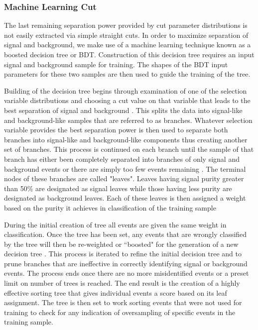 \documentclass{gatech-thesis}
\begin{document}
\subsubsection{Machine Learning Cut}
The last remaining separation power provided by cut parameter distributions is not easily extracted via simple straight cuts. In order to maximize separation of signal and background, we make use of a machine learning technique known as a boosted decision tree or BDT. Construction of this decision tree requires an input signal and background sample for training. The shapes of the BDT input parameters for these two samples are then used to guide the training of the tree.

Building of the decision tree begins through examination of one of the selection variable distributions and choosing a cut value on that variable that leads to the best separation of signal and background \cite{MachineLearning}. This splits the data into signal-like and background-like samples that are referred to as branches. Whatever selection variable provides the best separation power is then used to separate both branches into signal-like and background-like components thus creating another set of branches. This process is continued on each branch until the sample of that branch has either been completely separated into branches of only signal and background events or there are simply too few events remaining \cite{MachineLearning}. The terminal nodes of these branches are called "leaves". Leaves having signal purity greater than 50$\%$ are designated as signal leaves while those having less purity are designated as background leaves. Each of these leaves is then assigned a weight based on the purity it achieves in classification of the training sample

During the initial creation of tree all events are given the same weight in classification. Once the tree has been set, any events that are wrongly classified by the tree will then be re-weighted or ``boosted" for the generation of a new decision tree \cite{MachineLearning}. This process is iterated to refine the initial decision tree and to prune branches that are ineffective in correctly identifying signal or background events. The process ends once there are no more misidentified events or a preset limit on number of trees is reached. The end result is the creation of a highly effective sorting tree that gives individual events a score based on its leaf assignment. The tree is then set to work sorting events that were not used for training to check for any indication of oversampling of specific events in the training sample. 
\end{document}
